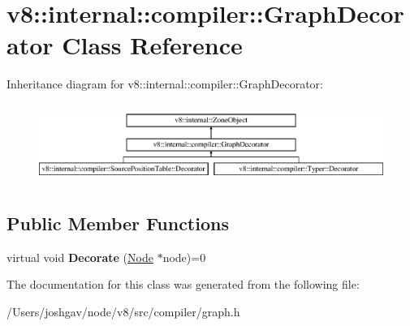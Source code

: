 \hypertarget{classv8_1_1internal_1_1compiler_1_1_graph_decorator}{}\section{v8\+:\+:internal\+:\+:compiler\+:\+:Graph\+Decorator Class Reference}
\label{classv8_1_1internal_1_1compiler_1_1_graph_decorator}
Inheritance diagram for v8\+:\+:internal\+:\+:compiler\+:\+:Graph\+Decorator\+:\begin{figure}[H]
\begin{center}
\leavevmode
\includegraphics[height=2.616822cm]{classv8_1_1internal_1_1compiler_1_1_graph_decorator}
\end{center}
\end{figure}
\subsection*{Public Member Functions}
\begin{DoxyCompactItemize}
\item 
virtual void {\bfseries Decorate} (\hyperlink{classv8_1_1internal_1_1compiler_1_1_node}{Node} $\ast$node)=0\hypertarget{classv8_1_1internal_1_1compiler_1_1_graph_decorator_ac4ce579c72bf1a98aa0bbb1e39d4d23e}{}\label{classv8_1_1internal_1_1compiler_1_1_graph_decorator_ac4ce579c72bf1a98aa0bbb1e39d4d23e}

\end{DoxyCompactItemize}


The documentation for this class was generated from the following file\+:\begin{DoxyCompactItemize}
\item 
/\+Users/joshgav/node/v8/src/compiler/graph.\+h\end{DoxyCompactItemize}
